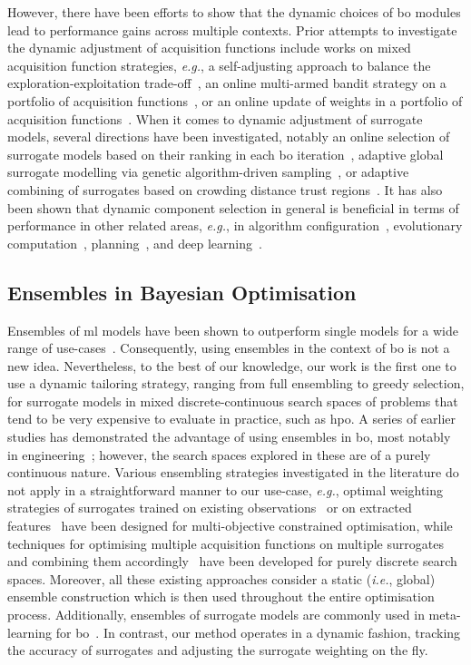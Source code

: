 However, there have been efforts to show that the dynamic choices of \gls{bo} modules lead to performance gains across multiple contexts.
Prior attempts to investigate the dynamic adjustment of acquisition functions include works on mixed acquisition function strategies, \emph{e.g.}, a self-adjusting approach to balance the exploration-exploitation trade-off~\citep{BenEtAl23}, an online multi-armed bandit strategy on a portfolio of acquisition functions~\citep{HofEtAl11b}, or an online update of weights in a portfolio of acquisition functions~\citep{KanEtAl20}.
When it comes to dynamic adjustment of surrogate models, several directions have been investigated, notably an online selection of surrogate models based on their ranking in each \gls{bo} iteration~\citep{BagEtAl16}, adaptive global surrogate modelling via genetic algorithm-driven sampling~\citep{GorEtAl09}, or adaptive combining of surrogates based on crowding distance trust regions~\citep{ZhaEtAl12}.
It has also been shown that dynamic component selection in general is beneficial in terms of performance in other related areas, \emph{e.g.}, in algorithm configuration~\citep{BieEtAl20b}, evolutionary computation~\citep{KarEtAl15,DoeDoe20}, planning~\citep{SpeEtAl21}, and deep learning~\citep{AdrEtAl22}.

\subsection{Ensembles in Bayesian Optimisation}
Ensembles of \gls{ml} models have been shown to outperform single models for a wide range of use-cases~\citep{SagRok18,OpiMac99,Rokach10,DonEtAl20}.
Consequently, using ensembles in the context of \gls{bo} is not a new idea.
Nevertheless, to the best of our knowledge, our work is the first one to use a
dynamic tailoring strategy, ranging from full ensembling to greedy selection, for surrogate models in mixed discrete-continuous search spaces of problems that tend to be very expensive to evaluate in practice, such as \gls{hpo}.
A series of earlier studies has demonstrated the advantage of using ensembles in \gls{bo}, most notably in engineering~\citep{JiaEtAl20,ZhoEtAl11}; however, the search spaces explored in these are of a purely continuous nature.
Various ensembling strategies investigated in the literature do not apply in a straightforward manner to our use-case, \emph{e.g.}, optimal weighting strategies of surrogates trained on existing observations~\citep{HanEtAl22c} or on extracted features~\citep{GuoEtAl19} have been designed for multi-objective constrained optimisation, while techniques for optimising multiple acquisition functions on multiple surrogates and combining them accordingly~\citep{HuaEtAl22c, BeaEtAl19} have been developed for purely discrete search spaces.
Moreover, all these existing approaches consider a static (\emph{i.e.}, global) ensemble construction which is then used throughout the entire optimisation process. Additionally, ensembles of surrogate models are commonly used in meta-learning for \gls{bo}~\citep{WisEtAl16,FeuEtAl22b}.
In contrast, our method operates in a dynamic fashion, tracking the accuracy of surrogates and adjusting the surrogate weighting on the fly.

